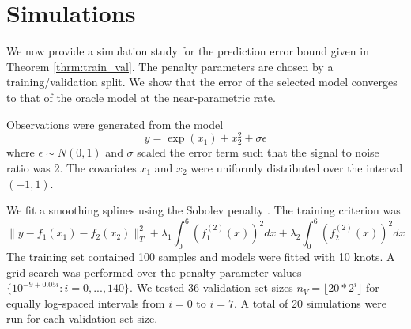 \documentclass[12pt]{article}
\newtheorem{lemma}{Lemma}
\begin{document}
%
%
%

\section{Simulations}\label{sec:simulations}

We now provide a simulation study for the prediction error bound given in Theorem \ref{thrm:train_val}. The penalty parameters are chosen by a training/validation split. We show that the error of the selected model converges to that of the oracle model at the near-parametric rate.

Observations were generated from the model
\begin{equation}
y = \exp(x_1) + x_2^2 + \sigma \epsilon
\end{equation}
where $\epsilon \sim N(0,1)$ and $\sigma$ scaled the error term such that the signal to noise ratio was 2.
The covariates $x_1$ and $x_2$ were uniformly distributed over the interval $(-1, 1)$.

We fit a smoothing splines using the Sobolev penalty \citep{de1978practical, wahba1990spline, green1994nonparametric}. The training criterion was
\begin{equation}
\| y - f_1(x_1) - f_2(x_2) \|_T^2 + \lambda_1 \int_0^6 (f_1^{(2)}(x))^2 dx + \lambda_2 \int_0^6 (f_2^{(2)}(x))^2 dx
\end{equation}
The training set contained 100 samples and models were fitted with 10 knots. A grid search was performed over the penalty parameter values $\{10^{-9 + 0.05i}: i = 0, ..., 140 \}$. We tested 36 validation set sizes $n_V = \lfloor 20 * 2^{i} \rfloor$ for equally log-spaced intervals from $i = 0$ to $i = 7$. A total of 20 simulations were run for each validation set size.
\end{document}
